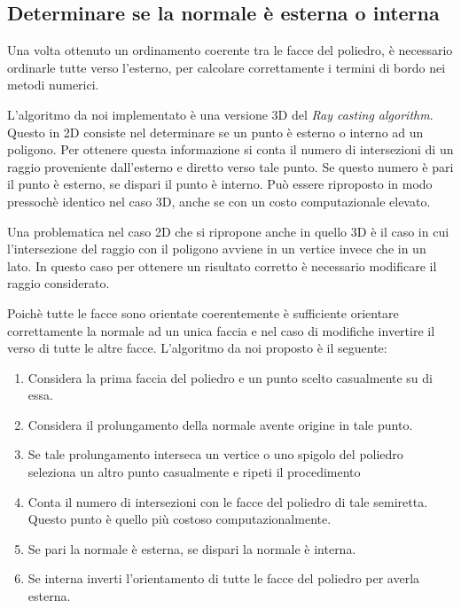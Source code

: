 \documentclass[oneside,12pt]{book}  %
\theoremstyle{plain}
\theoremstyle{definition}
\theoremstyle{remark}
\numberwithin{equation}{chapter} %
\begin{document}
\subsection{Determinare se la normale \`e esterna o interna}
Una volta ottenuto un ordinamento coerente tra le facce del poliedro,
\`e necessario ordinarle tutte verso l'esterno, per calcolare
correttamente i termini di bordo nei metodi numerici.

L'algoritmo da noi implementato \`e una versione 3D del \textit{Ray
  casting algorithm}. Questo in 2D consiste nel determinare se un
punto \`e esterno o interno ad un poligono. Per ottenere questa
informazione si conta il numero di intersezioni di un raggio
proveniente dall'esterno e diretto verso tale punto. Se questo numero \`e pari il
punto \`e esterno, se dispari il punto \`e interno. Pu\`o essere
riproposto in modo pressoch\`e identico nel caso 3D, anche se con un
costo computazionale elevato.

Una problematica nel caso 2D che si ripropone anche in quello 3D \`e
il caso in cui l'intersezione del raggio con il poligono avviene in un
vertice invece che in un lato. In questo caso per ottenere un
risultato corretto \`e necessario modificare il raggio considerato. 

Poich\`e tutte le facce sono orientate coerentemente \`e sufficiente
orientare correttamente la normale ad un unica faccia e nel caso di
modifiche invertire il verso di tutte le altre facce.
L'algoritmo da noi proposto \`e il seguente:
\begin{enumerate}
\item Considera la prima faccia del poliedro e un punto scelto
  casualmente su di essa.
\item Considera il prolungamento della normale avente origine in tale
  punto.
\item Se tale prolungamento interseca un vertice o uno spigolo del poliedro
  seleziona un altro punto casualmente e ripeti il procedimento
\item Conta il numero di intersezioni con le facce del poliedro di
  tale semiretta. Questo punto \`e quello pi\`u costoso computazionalmente.
\item Se pari la normale \`e esterna, se dispari la normale \`e
  interna.
\item Se interna inverti l'orientamento di tutte le facce del poliedro
  per averla esterna.

\end{enumerate}
\end{document}
